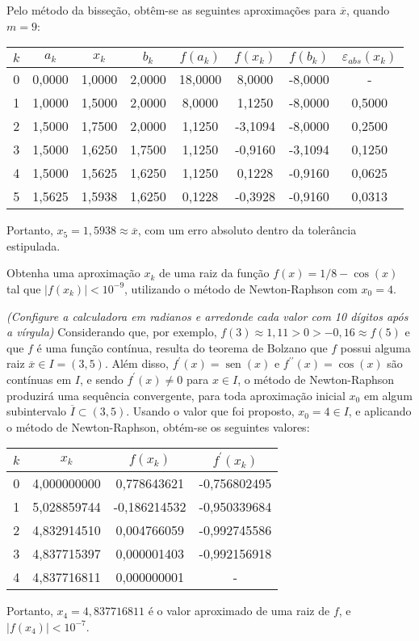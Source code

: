 \documentclass[12pt,a4paper]{article}
\newcommand*\sen{\operatorname{sen}}
\begin{document}
\begin{ExerciseList}
Pelo método da bisseção, obtêm-se as seguintes aproximações para $\overline{x}$, quando $m = 9$:
\medskip
\begin{center}
\begin{tabular}{cccccccc}
\hline
$k$ & $a_k$ & $x_k$ & $b_k$ & $f(a_k)$ & $f(x_k)$ & $f(b_k)$ & $\varepsilon_{abs}(x_k)$\\\hline
0 & 0,0000 & 1,0000 & 2,0000 & 18,0000 & 8,0000 & -8,0000 & -\\
1 & 1,0000 & 1,5000 & 2,0000 & 8,0000 & 1,1250 & -8,0000 & 0,5000\\
2 & 1,5000 & 1,7500 & 2,0000 & 1,1250 & -3,1094 & -8,0000 & 0,2500\\
3 & 1,5000 & 1,6250 & 1,7500 & 1,1250 & -0,9160 & -3,1094 & 0,1250\\
4 & 1,5000 & 1,5625 & 1,6250 & 1,1250 & 0,1228 & -0,9160 & 0,0625\\
5 & 1,5625 & 1,5938 & 1,6250 & 0,1228 & -0,3928 & -0,9160 & 0,0313\\
\hline
\end{tabular}
\end{center}
\medskip
Portanto, $x_5 = 1,5938 \approx \overline{x}$, com um erro absoluto dentro da tolerância estipulada.

\Exercise[title={2,5}]
Obtenha uma aproximação $x_k$ de uma raiz da função $f(x) = 1/8-\cos(x)$ tal que $|f(x_k)|<10^{-9}$, utilizando o método de Newton-Raphson com $x_0 = 4$.

\textit{(Configure a calculadora em radianos e arredonde cada valor com 10 dígitos após a vírgula)}
\Answer
Considerando que, por exemplo, $f(3) \approx 1,11 > 0 > -0,16 \approx f(5)$ e que $f$ é uma função contínua, resulta do teorema de Bolzano que $f$ possui alguma raiz $\overline{x} \in I = (3, 5)$. Além disso, $f^\prime(x) = \sen(x)$ e $f^{\prime\prime}(x) = \cos(x)$ são contínuas em $I$, e sendo $f^\prime(x) \neq 0$ para $x \in I$, o método de Newton-Raphson produzirá uma sequência convergente, para toda aproximação inicial $x_0$ em algum subintervalo $\overline{I} \subset (3, 5)$. Usando o valor que foi proposto, $x_0 = 4 \in I$, e aplicando o método de Newton-Raphson, obtém-se os seguintes valores:
\medskip
\begin{center}
\begin{tabular}{cccc}
\hline
$k$ & $x_k$ & $f(x_k)$ & $f^\prime(x_k)$ \\\hline
0 & 4,000000000 &  0,778643621 & -0,756802495\\
1 & 5,028859744 & -0,186214532 & -0,950339684\\
2 & 4,832914510 &  0,004766059 & -0,992745586\\
3 & 4,837715397 &  0,000001403 & -0,992156918\\
4 & 4,837716811 &  0,000000001 & -\\\hline
\end{tabular}
\end{center}
\medskip
Portanto, $x_4 = 4,837716811$ é o valor aproximado de uma raiz de $f$, e $|f(x_4)| < 10^{-7}$.



\end{ExerciseList}
\end{document}
